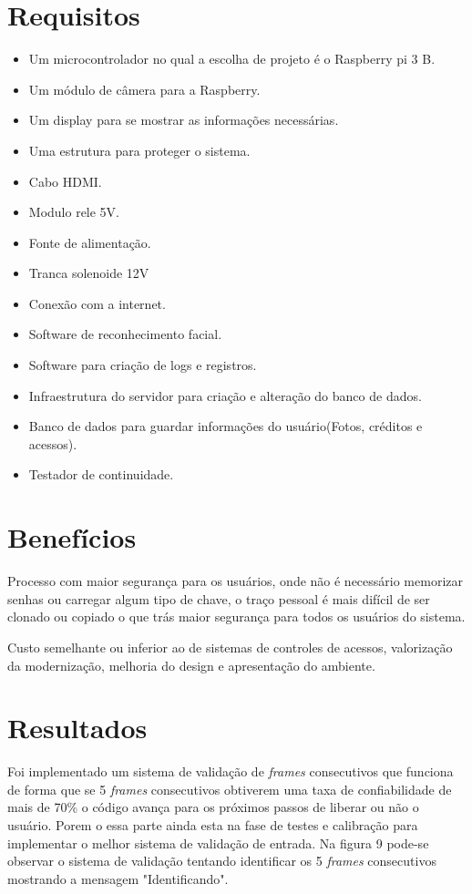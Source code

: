 \documentclass[conference,compsoc]{IEEEtran}
\begin{document}
\section{Requisitos}
\begin{itemize}
   \item Um microcontrolador no qual a escolha de projeto é o Raspberry pi 3 B. 
   \item Um módulo de câmera para a Raspberry.
   \item Um display para se mostrar as informações necessárias.
   \item Uma estrutura para proteger o sistema.
   \item Cabo HDMI.
   \item Modulo rele 5V.
   \item Fonte de alimentação.
   \item Tranca solenoide 12V
   \item Conexão com a internet.
   \item Software de reconhecimento facial.
   \item Software  para criação de logs e registros.
   \item  Infraestrutura do servidor para criação e alteração do banco de dados.
   \item Banco de dados para guardar informações do usuário(Fotos, créditos e acessos).
   \item Testador de continuidade.
 \end{itemize}
 
\section{Benefícios}
Processo com maior segurança para os usuários, onde não é necessário  memorizar senhas ou carregar algum tipo de chave, o traço pessoal é mais difícil de ser clonado ou copiado o que trás maior segurança para todos os usuários do sistema.

Custo semelhante ou inferior ao de sistemas de controles de acessos, valorização da modernização, melhoria do design e apresentação do ambiente.

\section{Resultados}

Foi implementado um sistema de validação de \emph{frames} consecutivos que funciona de forma que se 5 \emph{frames} consecutivos obtiverem uma taxa de confiabilidade de mais de 70\% o código avança para os próximos passos de liberar ou não o usuário. Porem o essa parte ainda esta na fase de testes e calibração para implementar o melhor sistema de validação de entrada. Na figura 9 pode-se observar o sistema de validação tentando identificar os 5 \emph{frames} consecutivos mostrando a mensagem "Identificando". 
\end{document}
